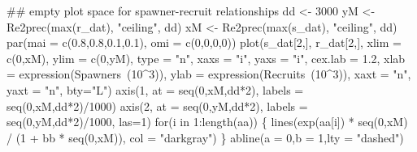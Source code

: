 \documentclass[11pt,]{article}
\newenvironment{Shaded}{}{}
\newcommand{\CommentTok}[1]{\textcolor[rgb]{0.00,0.50,0.00}{#1}}
\newcommand{\ControlFlowTok}[1]{\textcolor[rgb]{0.00,0.00,1.00}{#1}}
\newcommand{\DataTypeTok}[1]{#1}
\newcommand{\DecValTok}[1]{#1}
\newcommand{\FloatTok}[1]{#1}
\newcommand{\KeywordTok}[1]{\textcolor[rgb]{0.00,0.00,1.00}{#1}}
\newcommand{\NormalTok}[1]{#1}
\newcommand{\OperatorTok}[1]{#1}
\newcommand{\StringTok}[1]{\textcolor[rgb]{0.00,0.50,0.50}{#1}}
\begin{document}
\begin{Shaded}
\begin{Highlighting}[]
\CommentTok{## empty plot space for spawner-recruit relationships}
\NormalTok{dd <-}\StringTok{ }\DecValTok{3000}
\NormalTok{yM <-}\StringTok{ }\KeywordTok{Re2prec}\NormalTok{(}\KeywordTok{max}\NormalTok{(r_dat), }\StringTok{"ceiling"}\NormalTok{, dd)}
\NormalTok{xM <-}\StringTok{ }\KeywordTok{Re2prec}\NormalTok{(}\KeywordTok{max}\NormalTok{(s_dat), }\StringTok{"ceiling"}\NormalTok{, dd)}
\KeywordTok{par}\NormalTok{(}\DataTypeTok{mai =} \KeywordTok{c}\NormalTok{(}\FloatTok{0.8}\NormalTok{,}\FloatTok{0.8}\NormalTok{,}\FloatTok{0.1}\NormalTok{,}\FloatTok{0.1}\NormalTok{), }\DataTypeTok{omi =} \KeywordTok{c}\NormalTok{(}\DecValTok{0}\NormalTok{,}\DecValTok{0}\NormalTok{,}\DecValTok{0}\NormalTok{,}\DecValTok{0}\NormalTok{))}
\KeywordTok{plot}\NormalTok{(s_dat[}\DecValTok{2}\NormalTok{,], r_dat[}\DecValTok{2}\NormalTok{,], }\DataTypeTok{xlim =} \KeywordTok{c}\NormalTok{(}\DecValTok{0}\NormalTok{,xM), }\DataTypeTok{ylim =} \KeywordTok{c}\NormalTok{(}\DecValTok{0}\NormalTok{,yM), }\DataTypeTok{type =} \StringTok{"n"}\NormalTok{,}
     \DataTypeTok{xaxs =} \StringTok{"i"}\NormalTok{, }\DataTypeTok{yaxs =} \StringTok{"i"}\NormalTok{, }\DataTypeTok{cex.lab =} \FloatTok{1.2}\NormalTok{,}
     \DataTypeTok{xlab =} \KeywordTok{expression}\NormalTok{(Spawners}\OperatorTok{~}\NormalTok{(}\DecValTok{10}\OperatorTok{^}\DecValTok{3}\NormalTok{)),}
     \DataTypeTok{ylab =} \KeywordTok{expression}\NormalTok{(Recruits}\OperatorTok{~}\NormalTok{(}\DecValTok{10}\OperatorTok{^}\DecValTok{3}\NormalTok{)),}
     \DataTypeTok{xaxt =} \StringTok{"n"}\NormalTok{, }\DataTypeTok{yaxt =} \StringTok{"n"}\NormalTok{, }\DataTypeTok{bty=}\StringTok{"L"}\NormalTok{)}
\KeywordTok{axis}\NormalTok{(}\DecValTok{1}\NormalTok{, }\DataTypeTok{at =} \KeywordTok{seq}\NormalTok{(}\DecValTok{0}\NormalTok{,xM,dd}\OperatorTok{*}\DecValTok{2}\NormalTok{), }\DataTypeTok{labels =} \KeywordTok{seq}\NormalTok{(}\DecValTok{0}\NormalTok{,xM,dd}\OperatorTok{*}\DecValTok{2}\NormalTok{)}\OperatorTok{/}\DecValTok{1000}\NormalTok{)}
\KeywordTok{axis}\NormalTok{(}\DecValTok{2}\NormalTok{, }\DataTypeTok{at =} \KeywordTok{seq}\NormalTok{(}\DecValTok{0}\NormalTok{,yM,dd}\OperatorTok{*}\DecValTok{2}\NormalTok{), }\DataTypeTok{labels =} \KeywordTok{seq}\NormalTok{(}\DecValTok{0}\NormalTok{,yM,dd}\OperatorTok{*}\DecValTok{2}\NormalTok{)}\OperatorTok{/}\DecValTok{1000}\NormalTok{, }\DataTypeTok{las=}\DecValTok{1}\NormalTok{)}
\ControlFlowTok{for}\NormalTok{(i }\ControlFlowTok{in} \DecValTok{1}\OperatorTok{:}\KeywordTok{length}\NormalTok{(aa)) \{}
  \KeywordTok{lines}\NormalTok{(}\KeywordTok{exp}\NormalTok{(aa[i]) }\OperatorTok{*}\StringTok{ }\KeywordTok{seq}\NormalTok{(}\DecValTok{0}\NormalTok{,xM) }\OperatorTok{/}\StringTok{ }\NormalTok{(}\DecValTok{1} \OperatorTok{+}\StringTok{ }\NormalTok{bb }\OperatorTok{*}\StringTok{ }\KeywordTok{seq}\NormalTok{(}\DecValTok{0}\NormalTok{,xM)),}
        \DataTypeTok{col =} \StringTok{"darkgray"}\NormalTok{)}
\NormalTok{\}}
\KeywordTok{abline}\NormalTok{(}\DataTypeTok{a =} \DecValTok{0}\NormalTok{,}\DataTypeTok{b =} \DecValTok{1}\NormalTok{,}\DataTypeTok{lty =} \StringTok{"dashed"}\NormalTok{)}


\end{Highlighting}
\end{Shaded}
\end{document}
